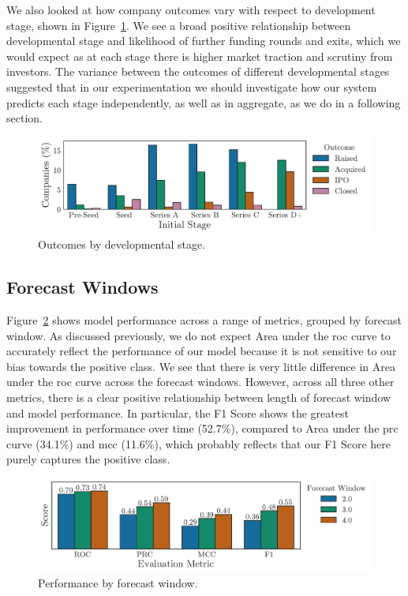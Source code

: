 ﻿\documentclass[../thesis/thesis.tex]{subfiles}
\begin{document}
We also looked at how company outcomes vary with respect to development stage, shown in Figure~\ref{fig:evaluation:outcome_stage}. We see a broad positive relationship between developmental stage and likelihood of further funding rounds and exits, which we would expect as at each stage there is higher market traction and scrutiny from investors. The variance between the outcomes of different developmental stages suggested that in our experimentation we should investigate how our system predicts each stage independently, as well as in aggregate, as we do in a following section.

\begin{figure}[!htb]
    \centering
    \includegraphics[width=\textwidth]{../figures/evaluation/outcomes_stage}
    \caption[Outcomes by developmental stage]{Outcomes by developmental stage.}
    \label{fig:evaluation:outcome_stage}
\end{figure}

\subsection{Forecast Windows}


Figure~\ref{fig:evaluation:performance_window} shows model performance across a range of metrics, grouped by forecast window. As discussed previously, we do not expect Area under the \gls{roc} curve to accurately reflect the performance of our model because it is not sensitive to our bias towards the positive class. We see that there is very little difference in Area under the \gls{roc} curve across the forecast windows. However, across all three other metrics, there is a clear positive relationship between length of forecast window and model performance. In particular, the F1 Score shows the greatest improvement in performance over time (52.7\%), compared to Area under the \gls{prc} curve (34.1\%) and \gls{mcc} (11.6\%), which probably reflects that our F1 Score here purely captures the positive class. 

\begin{figure}[!htb]
    \centering
    \includegraphics[width=\textwidth]{../figures/evaluation/performance_window}
    \caption[Performance by forecast window]{Performance by forecast window.}
    \label{fig:evaluation:performance_window}
\end{figure}
\end{document}
